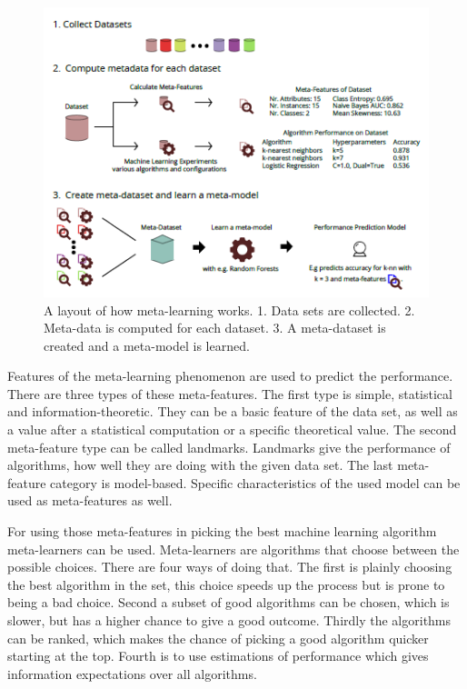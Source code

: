 \begin{figure}
	\label{fig:Meta-LearningLayout}
	\includegraphics[scale=1]{Meta-LearningLayout.png}
	\caption{A layout of how meta-learning works. 1. Data sets are collected. 2. Meta-data is computed for each dataset. 3. A meta-dataset is created and a meta-model is learned\cite{Gijsbers2017Thesis}.}
\end{figure}

Features of the meta-learning phenomenon are used to predict the performance. There are three types of these meta-features. The first type is simple, statistical and information-theoretic. They can be a basic feature of the data set, as well as a value after a statistical computation or a specific theoretical value. The second meta-feature type can be called landmarks. Landmarks give the performance of algorithms, how well they are doing with the given data set. The last meta-feature category is model-based. Specific characteristics of the used model can be used as meta-features as well\cite{brazdil1994characterizing, vilalta2004using}.

For using those meta-features in picking the best machine learning algorithm meta-learners can be used. Meta-learners are algorithms that choose between the possible choices. There are four ways of doing that. The first is plainly choosing the best algorithm in the set, this choice speeds up the process but is prone to being a bad choice. Second a subset of good algorithms can be chosen, which is slower, but has a higher chance to give a good outcome. Thirdly the algorithms can be ranked, which makes the chance of picking a good algorithm quicker starting at the top. Fourth is to use estimations of performance which gives information expectations over all algorithms\cite{brazdil2009development}.
	
